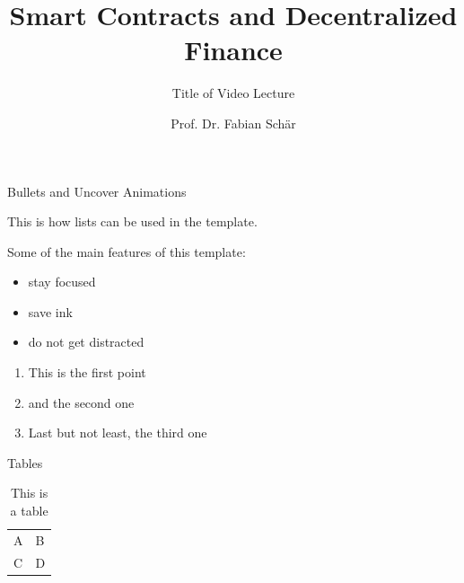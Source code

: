 \documentclass[]{beamer}
\title{Smart Contracts and Decentralized Finance}
\subtitle{Title of Video Lecture}
\author{Prof. Dr. Fabian Schär}
\institute{University of Basel}
\begin{document}
\thispagestyle{empty}
\begin{frame}[noframenumbering]
	\titlepage
\end{frame}

\begin{frame}{Bullets and Uncover Animations}

This is how lists can be used in the template. \\ \vspace{1em}

Some of the main features of this template:
	
	\begin{itemize}
		\item<1-> stay focused
		\item<2-> save ink
		\item<3-> do not get distracted
	\end{itemize}

	\vspace{1em}	

	\begin{enumerate}
		\item<5-> This is the first point
		\item<6-> and the second one
		\item<7-> Last but not least, the third one
	\end{enumerate}
	
\end{frame}

\begin{frame}{Tables}
	\begin{table}
		\begin{tabular}{ll}
			A & B\\
			C & D
		\end{tabular}
		\caption{This is a table}
		\label{tbl:simpletable}
	\end{table}
\end{frame}

\end{document}
